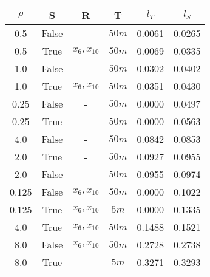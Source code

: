 \begin{tabular}{| c c | c c | c c |}
\hline
$\rho{}$ & S & R & T & $l_T$ & $l_S$ \\
\hline
0.5 & False & - & $50m$ & 0.0061 & 0.0265 \\
0.5 & True & $x_{6}, x_{10}$ & $50m$ & 0.0069 & 0.0335 \\
1.0 & False & - & $50m$ & 0.0302 & 0.0402 \\
1.0 & True & $x_{6}, x_{10}$ & $50m$ & 0.0351 & 0.0430 \\
0.25 & False & - & $50m$ & 0.0000 & 0.0497 \\
0.25 & True & - & $50m$ & 0.0000 & 0.0563 \\
4.0 & False & - & $50m$ & 0.0842 & 0.0853 \\
2.0 & True & - & $50m$ & 0.0927 & 0.0955 \\
2.0 & False & - & $50m$ & 0.0955 & 0.0974 \\
0.125 & False & $x_{6}, x_{10}$ & $50m$ & 0.0000 & 0.1022 \\
0.125 & True & $x_{6}, x_{10}$ & $5m$ & 0.0000 & 0.1335 \\
4.0 & True & $x_{6}, x_{10}$ & $50m$ & 0.1488 & 0.1521 \\
8.0 & False & $x_{6}, x_{10}$ & $50m$ & 0.2728 & 0.2738 \\
8.0 & True & - & $5m$ & 0.3271 & 0.3293 \\
\hline
\end{tabular}
